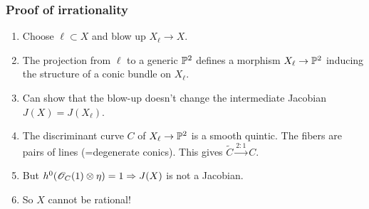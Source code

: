 \begin{frame}
\frametitle{Proof of irrationality}

\begin{enumerate}
	\item Choose $\ell \subset X$ and blow up $X_\ell \to X$.
	\pause
	\item The projection from $\ell$ to a generic $\P^2$ defines a morphism $X_\ell \to \P^2$ inducing the structure of a conic bundle on $X_\ell$.
	\pause
	\item Can show that the blow-up doesn't change the intermediate Jacobian $J(X)=J(X_\ell)$.
	\pause
	\item The discriminant curve $C$ of $X_\ell \to \P^2$ is a smooth quintic. The fibers are pairs of lines (=degenerate conics). This gives $\widetilde C \xrightarrow{2:1} C$.
	\pause
	\item But $h^0(\OO_C(1) \otimes \eta)=1 \Rightarrow J(X)$ is not a Jacobian.
	\pause
	\item So $X$ cannot be rational!
\end{enumerate}

\end{frame}